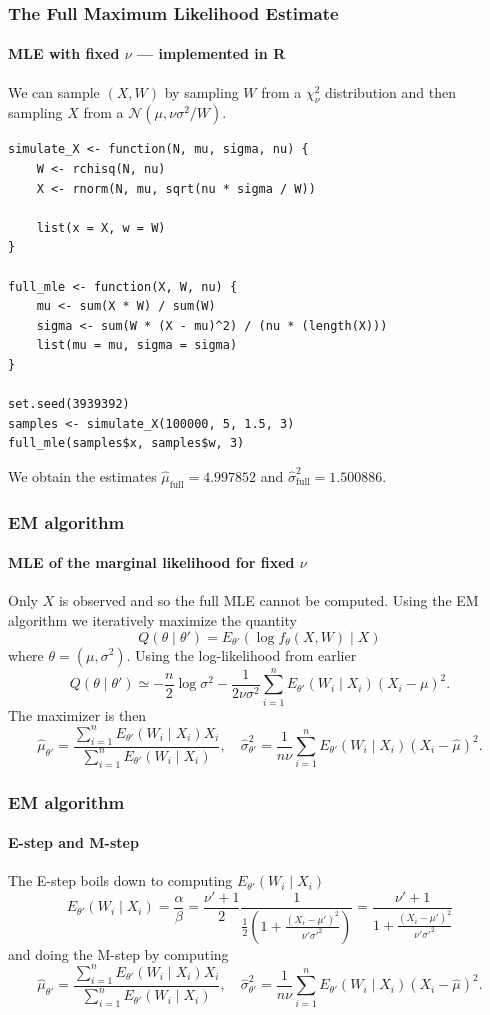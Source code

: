 \documentclass[aspectratio=169]{beamer}
\begin{document}
\begin{frame}[fragile]
    \frametitle{The Full Maximum Likelihood Estimate}
    \framesubtitle{MLE with fixed $\nu$ --- implemented in R}
    We can sample $(X,W)$ by sampling $W$ from a $\chi^{2}_{\nu}$ distribution and then sampling $X$ from a $\mathcal{N}(\mu, \nu\sigma^2/W)$.

\begin{verbatim}
simulate_X <- function(N, mu, sigma, nu) {
    W <- rchisq(N, nu)
    X <- rnorm(N, mu, sqrt(nu * sigma / W))
    
    list(x = X, w = W)
}
    
full_mle <- function(X, W, nu) {
    mu <- sum(X * W) / sum(W)
    sigma <- sum(W * (X - mu)^2) / (nu * (length(X)))
    list(mu = mu, sigma = sigma)
}

set.seed(3939392)
samples <- simulate_X(100000, 5, 1.5, 3)
full_mle(samples$x, samples$w, 3)
\end{verbatim}
We obtain the estimates $\hat\mu_{\text{full}} = 4.997852$ and $\hat\sigma^{2}_{\text{full}}=1.500886$.
\end{frame}
\begin{frame}
    \frametitle{EM algorithm}
    \framesubtitle{MLE of the marginal likelihood for fixed $\nu$}
    Only $X$ is observed and so the full MLE cannot be computed. Using the EM algorithm we iteratively maximize the quantity
    \begin{equation}
        Q(\theta\mid\theta')=E_{\theta'}(\log f_{\theta}(X, W)\mid X)
    \end{equation}
    where $\theta = (\mu,\sigma^2)$. Using the log-likelihood from earlier
    \begin{equation}
        Q(\theta\mid\theta')\simeq -\frac{n}{2}\log\sigma^{2}-\frac{1}{2\nu\sigma^{2}}\sum_{i=1}^{n}E_{\theta'}(W_{i}\mid X_{i})(X_{i}-\mu)^{2}.
    \end{equation}
    The maximizer is then
    \begin{equation*}
        \hat\mu_{\theta'} =\frac{\sum_{i=1}^{n}E_{\theta'}(W_{i}\mid X_{i})X_{i}}{\sum_{i=1}^{n}E_{\theta'}(W_{i}\mid X_{i})},\quad \hat\sigma^{2}_{\theta'}= \frac{1}{n\nu}\sum_{i=1}^{n}E_{\theta'}(W_{i}\mid X_{i})(X_{i}-\hat\mu)^{2}.
    \end{equation*}
\end{frame}
\begin{frame}
    \frametitle{EM algorithm}
    \framesubtitle{E-step and M-step}
    The E-step boils down to computing $E_{\theta'}(W_{i} \mid X_{i})$
    \begin{equation}
        E_{\theta'}(W_{i} \mid X_{i}) = \frac{\alpha}{\beta}=\frac{\nu' + 1}{2}\frac{1}{\frac{1}{2}\left(1 + \frac{(X_{i} - \mu')^{2}}{\nu'\sigma'^{2}}\right)}=\frac{\nu' + 1}{1 + \frac{(X_{i}- \mu')^{2}}{\nu'\sigma'^{2}}}
    \end{equation}
    and doing the M-step by computing
    \begin{equation*}
        \hat\mu_{\theta'} =\frac{\sum_{i=1}^{n}E_{\theta'}(W_{i}\mid X_{i})X_{i}}{\sum_{i=1}^{n}E_{\theta'}(W_{i}\mid X_{i})},\quad \hat\sigma^{2}_{\theta'}= \frac{1}{n\nu}\sum_{i=1}^{n}E_{\theta'}(W_{i}\mid X_{i})(X_{i}-\hat\mu)^{2}.
    \end{equation*}
\end{frame}
\end{document}

